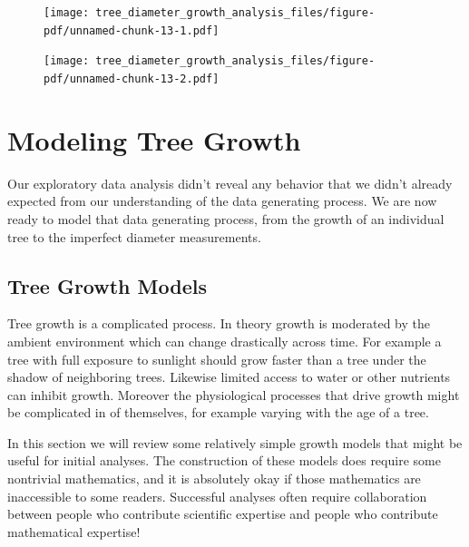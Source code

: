\documentclass[
  letterpaper,
  DIV=11,
  numbers=noendperiod]{scrartcl}
\begin{document}
\begin{figure}[H]

{\centering \texttt{[image: tree\_diameter\_growth\_analysis\_files/figure-pdf/unnamed-chunk-13-1.pdf]}

}

\end{figure}

\begin{figure}[H]

{\centering \texttt{[image: tree\_diameter\_growth\_analysis\_files/figure-pdf/unnamed-chunk-13-2.pdf]}

}

\end{figure}

\hypertarget{modeling-tree-growth}{%
\section{Modeling Tree Growth}\label{modeling-tree-growth}}

Our exploratory data analysis didn't reveal any behavior that we didn't
already expected from our understanding of the data generating process.
We are now ready to model that data generating process, from the growth
of an individual tree to the imperfect diameter measurements.

\hypertarget{tree-growth-models}{%
\subsection{Tree Growth Models}\label{tree-growth-models}}

Tree growth is a complicated process. In theory growth is moderated by
the ambient environment which can change drastically across time. For
example a tree with full exposure to sunlight should grow faster than a
tree under the shadow of neighboring trees. Likewise limited access to
water or other nutrients can inhibit growth. Moreover the physiological
processes that drive growth might be complicated in of themselves, for
example varying with the age of a tree.

In this section we will review some relatively simple growth models that
might be useful for initial analyses. The construction of these models
does require some nontrivial mathematics, and it is absolutely okay if
those mathematics are inaccessible to some readers. Successful analyses
often require collaboration between people who contribute scientific
expertise and people who contribute mathematical expertise!
\end{document}
